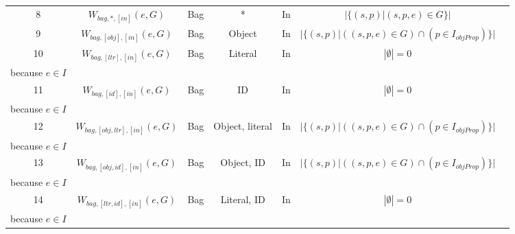 \begin{center}
{\begin{threeparttable}
\begin{tabular}{|c | c c c c c c |}
        8 & $W_{bag,*,[in]}(e,G)$ & Bag & * & In & $|\{(s, p) | (s, p, e) \in G\}|$ & \\
        9 & $W_{bag,[obj],[in]}(e,G)$ & Bag & Object & In & $|\{(s,p) | ((s, p, e) \in G) \cap (p \in I_{objProp})\}|$ & \\
        10 & $W_{bag,[ltr],[in]}(e,G)$ & Bag & Literal & In & $|\emptyset| = 0$ & \CellWithForceBreak{$p \in I_{objProp}$ \\ because $e \in I$} \\
        11 & $W_{bag,[id],[in]}(e,G)$ & Bag & ID & In & $|\emptyset| = 0$ & \CellWithForceBreak{$p \in I_{objProp}$ \\ because $e \in I$} \\
        12 & $W_{bag,[obj, ltr],[in]}(e,G)$ & Bag & Object, literal & In & $|\{(s,p) | ((s, p, e) \in G) \cap (p \in I_{objProp})\}|$ & \CellWithForceBreak{$p \in I_{objProp}$ \\ because $e \in I$} \\
        13 & $W_{bag,[obj, id],[in]}(e,G)$ & Bag & Object, ID & In & $|\{(s,p) | ((s, p, e) \in G) \cap (p \in I_{objProp})\}|$ & \CellWithForceBreak{$p \in I_{objProp}$ \\ because $e \in I$} \\
        14 & $W_{bag,[ltr, id],[in]}(e,G)$ & Bag & Literal, ID & In & $|\emptyset| = 0$ & \CellWithForceBreak{$p \in I_{objProp}$ \\ because $e \in I$} \\


\end{tabular}
\end{threeparttable}}
\end{center}

